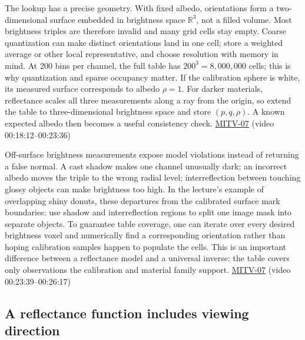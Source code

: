 The lookup has a precise geometry. With fixed albedo, orientations form a two-dimensional surface embedded in brightness space \(\mathbb R^3\), not a filled volume. Most brightness triples are therefore invalid and many grid cells stay empty. Coarse quantization can make distinct orientations land in one cell; store a weighted average or other local representative, and choose resolution with memory in mind. At 200 bins per channel, the full table has \(200^3=8{,}000{,}000\) cells; this is why quantization and sparse occupancy matter. If the calibration sphere is white, its measured surface corresponds to albedo \(\rho=1\). For darker materials, reflectance scales all three measurements along a ray from the origin, so extend the table to three-dimensional brightness space and store \((p,q,\rho)\). A known expected albedo then becomes a useful consistency check. \hyperref[04-visual-computing-ii-ch036-mitv-07---gradient-space-reflectance-map-image-irradiance-equation-gnomonic-projection]{MITV-07} (video 00:18:12--00:23:36)

Off-surface brightness measurements expose model violations instead of returning a false normal. A cast shadow makes one channel unusually dark; an incorrect albedo moves the triple to the wrong radial level; interreflection between touching glossy objects can make brightness too high. In the lecture's example of overlapping shiny donuts, these departures from the calibrated surface mark boundaries: use shadow and interreflection regions to split one image mask into separate objects. To guarantee table coverage, one can iterate over every desired brightness voxel and numerically find a corresponding orientation rather than hoping calibration samples happen to populate the cells. This is an important difference between a reflectance model and a universal inverse: the table covers only observations the calibration and material family support. \hyperref[04-visual-computing-ii-ch036-mitv-07---gradient-space-reflectance-map-image-irradiance-equation-gnomonic-projection]{MITV-07} (video 00:23:39--00:26:17)

\subsection{A reflectance function includes viewing direction}\label{04-visual-computing-ii-ch032-a-reflectance-function-includes-viewing-direction}

\hypertarget{04-visual-computing-ii-ch032-a-reflectance-function-includes-viewing-direction}{}

